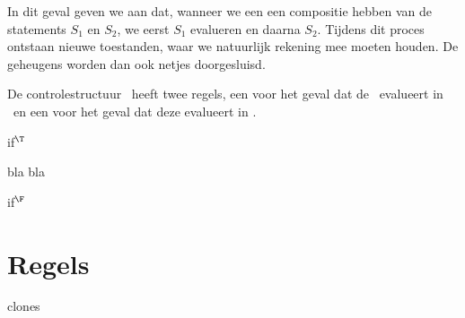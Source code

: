 In dit geval geven we aan dat, wanneer we een een compositie hebben van de statements $S_1$ en $S_2$, we eerst $S_1$ evalueren%
en daarna $S_2$. Tijdens dit proces ontstaan nieuwe toestanden, waar we natuurlijk rekening mee moeten houden. De geheugens worden dan ook netjes doorgesluisd.

De controlestructuur \IF\ heeft twee regels, een voor het geval dat de \BExpr\ evalueert in \T\ en een voor het geval dat deze evalueert in \F.

\begin{NSAxiom}{if$^\T$}
  \begin{prooftree}
  \end{prooftree}
  \begin{NSConditions}
  \end{NSConditions}
\end{NSAxiom}

bla bla

\begin{NSAxiom}{if$^\F$}
  \begin{prooftree}
  \end{prooftree}
  \begin{NSConditions}
  \end{NSConditions}
\end{NSAxiom}

\section*{Regels}

\begin{NSAxiom}{clones}
  \begin{prooftree}
  \end{prooftree}
  \begin{NSConditions}
  \end{NSConditions}
\end{NSAxiom}

